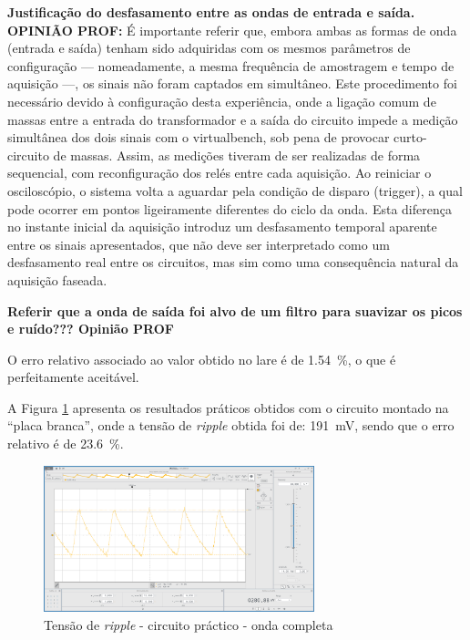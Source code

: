 \textbf{Justificação do desfasamento entre as ondas de entrada e saída. OPINIÃO PROF:} É importante referir que, embora ambas as formas de onda (entrada e saída) tenham sido adquiridas com os mesmos parâmetros de configuração — nomeadamente, a mesma frequência de amostragem e tempo de aquisição —, os sinais não foram captados em simultâneo. Este procedimento foi necessário devido à configuração desta experiência, onde a ligação comum de massas entre a entrada do transformador e a saída do circuito impede a medição simultânea dos dois sinais com o \acrshort{virtualbench}, sob pena de provocar curto-circuito de massas. Assim, as medições tiveram de ser realizadas de forma sequencial, com reconfiguração dos relés entre cada aquisição. Ao reiniciar o osciloscópio, o sistema volta a aguardar pela condição de disparo (trigger), a qual pode ocorrer em pontos ligeiramente diferentes do ciclo da onda. Esta diferença no instante inicial da aquisição introduz um desfasamento temporal aparente entre os sinais apresentados, que não deve ser interpretado como um desfasamento real entre os circuitos, mas sim como uma consequência natural da aquisição faseada.

\textbf{Referir que a onda de saída foi alvo de um filtro para suavizar os picos e ruído??? Opinião PROF}

O erro relativo associado ao valor obtido no \acrshort{lare} é de \SI{1.54}{\percent}, o que é perfeitamente aceitável.

A Figura \ref{fig:ripplepracticoondacompleta} apresenta os resultados práticos obtidos com o circuito montado na ``placa branca'', onde a tensão de \textit{ripple} obtida foi de: \SI{191}{\milli\volt}, sendo que o erro relativo é de \SI{23.6}{\percent}.

\begin{figure}[hbtp]
	\centering
	\includegraphics[width=0.7\textwidth]{figures/ripple_OC_placabranca.png}
	\caption{Tensão de \textit{ripple} - circuito práctico - onda completa}
	\label{fig:ripplepracticoondacompleta}
\end{figure}

